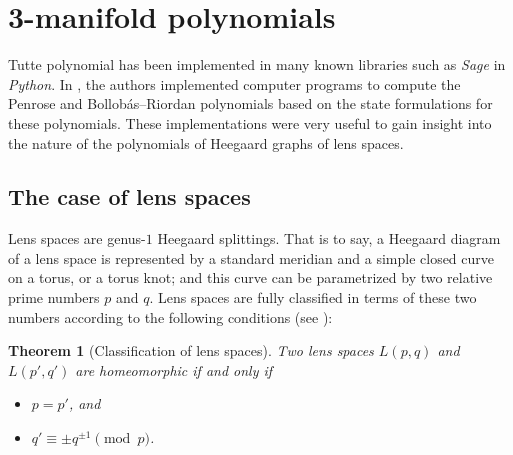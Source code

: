 \documentclass[pdflatex,sn-mathphys-num]{sn-jnl}%
\theoremstyle{plain}
\newtheorem{theorem}{Theorem}
\theoremstyle{definition}
\theoremstyle{remark}
\begin{document}


\section{3-manifold polynomials}\label{sec:3manifoldpolynomials}

Tutte polynomial has been implemented in many known libraries such as \emph{Sage} in \emph{Python}. In \cite{FG}, the authors implemented computer programs to compute the Penrose and Bollobás--Riordan polynomials based on the state formulations for these polynomials. These implementations were very useful to gain insight into the nature of the polynomials of Heegaard graphs of lens spaces.

\subsection{The case of lens spaces}\label{lens}

Lens spaces are genus-$1$ Heegaard splittings. That is to say, a Heegaard diagram of a lens space is represented by a standard meridian and a simple closed curve on a torus, or a torus knot; and this curve can be parametrized by two relative prime numbers $p$ and $q$. Lens spaces are fully classified in terms of these two numbers according to the following conditions (see \cite{Br}):      

\begin{theorem}[Classification of lens spaces]\label{teo:clas}
Two lens spaces $L(p,q)$ and $L(p',q')$ are homeomorphic if and only if
\begin{itemize}\itemindent=1.5em
\item[(i)] $p=p'$, and
\item[(ii)] $q'\equiv \pm q^{\pm 1} \pmod p$.
\end{itemize}
\end{theorem}
\end{document}
